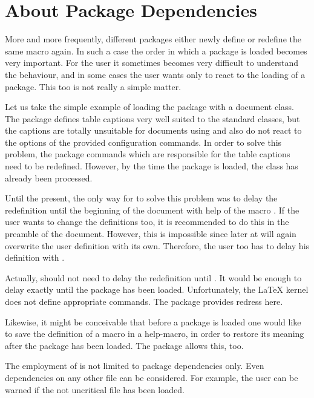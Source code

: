 \section{About Package Dependencies}
\label{sec:scrlfile.dependency}

More and more frequently, different packages either newly define or
redefine the same macro again.  In such a case the order in which a
package is loaded becomes very important.  For the user it sometimes
becomes very difficult to understand the behaviour, and in some
cases the user wants only to react to the loading of a package. This
too is not really a simple matter.

Let us take the simple example of loading the package  with
a {\KOMAScript} document class.  The  package defines table
captions very well suited to the standard classes, but the captions are
totally unsuitable for documents using {\KOMAScript} and also do not react to
the options of the provided configuration commands.  In order to solve this
problem, the  package commands which are responsible for
the table captions need to be redefined. However, by the time the
 package is loaded, the {\KOMAScript} class has already
been processed.

Until the present, the only way for {\KOMAScript} to solve this problem was to
delay the redefinition until the beginning of the document with help of the
macro .  If the user wants to change the definitions
too, it is recommended to do this in the preamble of the document.  However,
this is impossible since later at 
{\KOMAScript} will again overwrite the user definition with its own.
Therefore, the user too has to delay his definition with
.
  
Actually, {\KOMAScript} should not need to delay the redefinition until
.  It would be enough to delay exactly until
the package  has been loaded. Unfortunately, the {\LaTeX}
kernel does not define appropriate commands. The package 
provides redress here.
  
Likewise, it might be conceivable that before a package is loaded one would
like to save the definition of a macro in a help-macro, in order to restore
its meaning after the package has been loaded. The package 
allows this, too.
  
The employment of  is not limited to package dependencies
only.  Even dependencies on any other file can be considered.  For example,
the user can be warned if the not uncritical file  has been
loaded.
  
